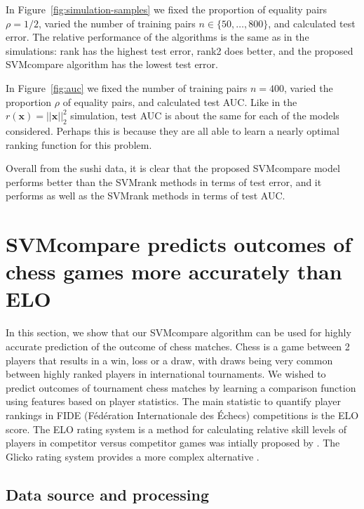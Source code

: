 \documentclass[twoside,11pt]{article}
\newcommand{\changed}[1]{
  #1
}
\begin{document}
In Figure~\ref{fig:simulation-samples} we fixed the proportion of
equality pairs $\rho=1/2$, varied the number of training pairs
$n\in\{50,\dots, 800\}$, and calculated test error. The relative
performance of the algorithms is the same as in the simulations: rank
has the highest test error, rank2 does better, and the proposed
SVMcompare algorithm has the lowest test error.

In Figure~\ref{fig:auc} we fixed the number of training pairs $n=400$,
varied the proportion $\rho$ of equality pairs, and calculated test
AUC. \changed{Like in the $r(\mathbf x)=||\mathbf x||_2^2$ simulation,
  test AUC is about the same for each of the models
  considered. Perhaps this is because they are all able to learn a
  nearly optimal ranking function for this problem.}

\changed{Overall from the sushi data, it is clear that the proposed SVMcompare
model performs better than the SVMrank methods in terms of test error,
and it performs as well as the SVMrank methods in terms of test AUC.
}

\section{SVMcompare predicts outcomes of chess games more accurately than ELO}
\label{sec:results_chess}

In this section, we show that our SVMcompare algorithm can be used for
highly accurate prediction of the outcome of chess matches. Chess is a
game between 2 players that results in a win, loss or a draw, with draws being very common between highly ranked players in international
tournaments. We wished to predict outcomes of tournament
chess matches by learning a comparison function using features based
on player statistics.  The main statistic to quantify player rankings
in FIDE (Fédération Internationale des Échecs) competitions is the ELO
score.  The ELO rating system is a method for calculating relative
skill levels of players in competitor versus competitor games was
intially proposed by \citet{elo_score}.
The Glicko rating system 
provides a more complex alternative \citep{Glicko}.

\subsection{Data source and processing}
\end{document}
